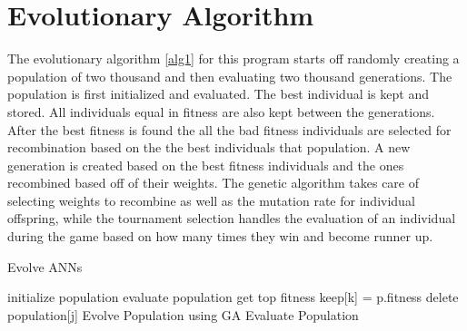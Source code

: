 \section{Evolutionary Algorithm}
The evolutionary algorithm \ref{alg1} for this program starts off randomly creating a population of two thousand and then evaluating two thousand generations. The population is first initialized and evaluated. The best individual is kept and stored. All individuals equal in fitness are also kept between the generations. After the best fitness is found the all the bad fitness individuals are selected for recombination based on the the best individuals that population. A new generation is created based on the best fitness individuals and the ones recombined based off of their weights. The genetic algorithm takes care of selecting weights to recombine as well as the mutation rate for individual offspring, while the tournament selection handles the evaluation of an individual during the game based on how many times they win and become runner up.

\begin{algorithm} [tbh]                     %
\caption{Evolve ANNs}          %
\label{alg1}                           %
\begin{algorithmic}                    %
    \STATE initialize population
    \STATE evaluate population
    	\STATE get top fitness
    				\STATE keep[k] = p.fitness
    			\ENDIF
    		\ENDFOR
    	\ENDFOR
    			\STATE delete population[j]
    		\ENDIF
    	\ENDFOR
    	\STATE Evolve Population using GA
    	\STATE Evaluate Population
    \ENDFOR
\end{algorithmic}
\end{algorithm}

